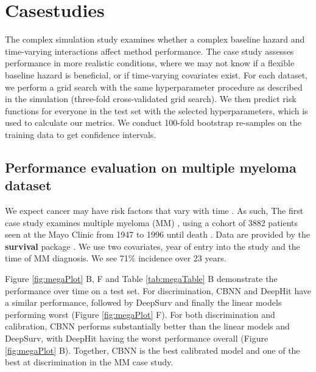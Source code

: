 \documentclass[APA,LATO1COL]{WileyNJD-v2}
\begin{document}
\hypertarget{casestudies}{%
\section{Casestudies}\label{casestudies}}

The complex simulation study examines whether a complex baseline hazard and time-varying interactions affect method performance.
The case study assesses performance in more realistic conditions, where we may not know if a flexible baseline hazard is beneficial, or if time-varying covariates
exist. For each dataset, we perform a grid search with the same hyperparameter procedure as described in the simulation (three-fold cross-validated grid search).
We then predict risk functions for everyone in the test set with the selected hyperparameters, which is used to calculate our metrics. We conduct 100-fold
bootstrap re-samples on the training data to get confidence intervals.

\hypertarget{pe-multiplemyeloma}{%
\subsection{Performance evaluation on multiple myeloma dataset}\label{pe-multiplemyeloma}}
We expect cancer may have risk factors that vary with time \citep{coradini2000time}. As such, The first case study examines multiple myeloma (MM) \citep{myeloma},
using a cohort of 3882 patients seen at the Mayo Clinic from 1947 to 1996 until death \citep{myeloma}. Data are provided by the \textbf{survival} package \citep{survpkg}.
We use two covariates, year of entry into the study and the time of MM diagnosis\citep{myeloma}. We see 71\% incidence over 23 years\citep{myeloma}.

Figure \ref{fig:megaPlot} B, F and Table \ref{tab:megaTable} B demonstrate the performance over time on a test set. For discrimination, CBNN and DeepHit have a
similar performance, followed by DeepSurv and finally the linear models performing worst (Figure \ref{fig:megaPlot} F). For both discrimination and calibration, CBNN
performs substantially better than the linear models and DeepSurv, with DeepHit having the worst performance overall (Figure \ref{fig:megaPlot} B). Together, CBNN
is the best calibrated model and one of the best at discrimination in the MM case study.

\end{document}
